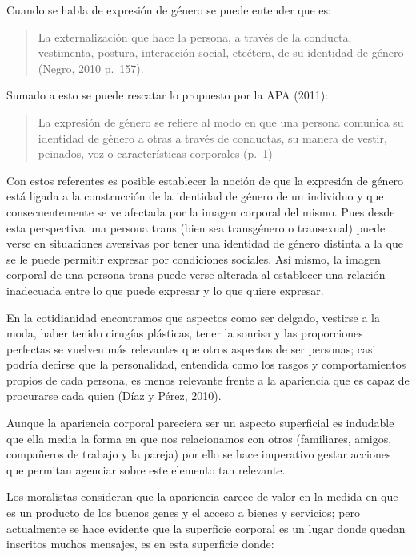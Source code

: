 Cuando se habla de expresión de género se puede entender que es:

\begin{quote}
    La externalización que hace la persona, a través de la conducta, vestimenta,
    postura, interacción social, etcétera, de su identidad de género (Negro, 2010 p.~157).
\end{quote}

Sumado a esto se puede rescatar lo propuesto por la APA (2011):

\begin{quote}
    La expresión de género se refiere al modo en que una persona comunica su
    identidad de género a otras a través de conductas, su manera de vestir,
    peinados, voz o características corporales (p.~1)
\end{quote}

Con estos referentes es posible establecer la noción de que la expresión de
género está ligada a la construcción de la identidad de género de un individuo y
que consecuentemente se ve afectada por la imagen corporal del mismo.
Pues desde esta perspectiva una persona trans (bien sea transgénero o
transexual) puede verse en situaciones aversivas por tener una identidad de
género distinta a la que se le puede permitir expresar por condiciones sociales.
Así mismo, la imagen corporal de una persona trans puede verse alterada al
establecer una relación inadecuada entre lo que puede expresar y lo que quiere
expresar.

En la cotidianidad encontramos que aspectos como ser delgado, vestirse a la
moda, haber tenido cirugías plásticas, tener la sonrisa y las proporciones
perfectas se vuelven más relevantes que otros aspectos de ser personas;
casi podría decirse que la personalidad, entendida como los rasgos y
comportamientos propios de cada persona, es menos relevante frente a la
apariencia que es capaz de procurarse cada quien (Díaz y Pérez, 2010).

Aunque la apariencia corporal pareciera ser un aspecto superficial es indudable
que ella media la forma en que nos relacionamos con otros (familiares, amigos,
compañeros de trabajo y la pareja) por ello se hace imperativo gestar acciones
que permitan agenciar sobre este elemento tan relevante.

Los moralistas consideran que la apariencia carece de valor en la medida en que
es un producto de los buenos genes y el acceso a bienes y servicios;
pero actualmente se hace evidente que la superficie corporal es un lugar
donde quedan inscritos muchos mensajes, es en esta superficie donde:


